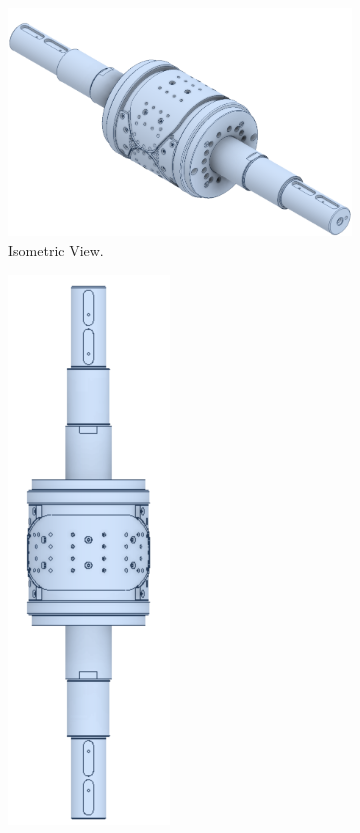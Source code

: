 \begin{figure}[H]
\centering
  \begin{subfigure}{0.35\textwidth}
  \centering
    \includegraphics[width=1.1\linewidth]{FIGURES/knife1.png}
    \caption{Isometric View.}
  \end{subfigure}
  \begin{subfigure}{0.3\textwidth}
  \centering
    \includegraphics[width=0.5\linewidth]{FIGURES/knife2.png}

\end{subfigure}
\end{figure}
